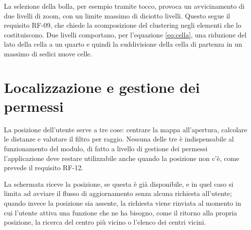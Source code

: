 
La selezione della bolla, per esempio tramite tocco, provoca un avvicinamento di due livelli di zoom, con un limite massimo di diciotto livelli.
Questo segue il requisito RF-09, che chiede la scomposizione del clustering negli elementi che lo costituiscono.
Due livelli comportano, per l'equazione \ref{eq:cella}, una riduzione del lato della cella a un quarto e quindi la suddivisione della cella di
partenza in un massimo di sedici nuove celle.

\section{Localizzazione e gestione dei permessi}\label{sec:impl-localizzazione}

La posizione dell'utente serve a tre cose: centrare la mappa all'apertura, calcolare le distanze e valutare il filtro per raggio.
Nessuna delle tre è indispensabile al funzionamento del modulo, di fatto a livello di gestione dei permessi
l'applicazione deve restare utilizzabile anche quando la posizione non c'è, come prevede il requisito RF-12.

La schermata riceve la posizione, se questa è già disponibile, e in quel caso si limita ad avviare il flusso di
aggiornamento senza alcuna richiesta all'utente; quando invece la posizione sia assente, la richiesta viene rinviata al momento in cui
l'utente attiva una funzione che ne ha bisogno, come il ritorno alla propria posizione, la ricerca del centro più vicino o l'elenco dei centri vicini.

